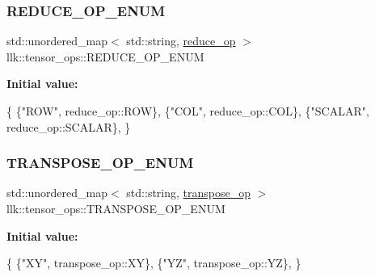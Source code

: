 \subsubsection{\texorpdfstring{R\+E\+D\+U\+C\+E\+\_\+\+O\+P\+\_\+\+E\+N\+UM}{REDUCE\_OP\_ENUM}}
{\footnotesize\ttfamily std\+::unordered\+\_\+map$<$ std\+::string, \hyperlink{namespacellk_1_1tensor__ops_a57720b85adbe1e9b3bbab02b985f0d8d}{reduce\+\_\+op} $>$ llk\+::tensor\+\_\+ops\+::\+R\+E\+D\+U\+C\+E\+\_\+\+O\+P\+\_\+\+E\+N\+UM}

{\bfseries Initial value\+:}
\begin{DoxyCode}
\{
    \{\textcolor{stringliteral}{"ROW"}, reduce\_op::ROW\},
    \{\textcolor{stringliteral}{"COL"}, reduce\_op::COL\},
    \{\textcolor{stringliteral}{"SCALAR"}, reduce\_op::SCALAR\},
\}
\end{DoxyCode}
\mbox{\label{namespacellk_1_1tensor__ops_a699c757265f6f94f500fd25438919ffa}} 
\subsubsection{\texorpdfstring{T\+R\+A\+N\+S\+P\+O\+S\+E\+\_\+\+O\+P\+\_\+\+E\+N\+UM}{TRANSPOSE\_OP\_ENUM}}
{\footnotesize\ttfamily std\+::unordered\+\_\+map$<$ std\+::string, \hyperlink{namespacellk_1_1tensor__ops_a3a9aca203c5d38260a1dd35253d57ee8}{transpose\+\_\+op} $>$ llk\+::tensor\+\_\+ops\+::\+T\+R\+A\+N\+S\+P\+O\+S\+E\+\_\+\+O\+P\+\_\+\+E\+N\+UM}

{\bfseries Initial value\+:}
\begin{DoxyCode}
\{
    \{\textcolor{stringliteral}{"XY"}, transpose\_op::XY\},
    \{\textcolor{stringliteral}{"YZ"}, transpose\_op::YZ\},
\}
\end{DoxyCode}
\mbox{\label{namespacellk_1_1tensor__ops_a1b8ad840d024cd3f488a6ab57dd3a36b}} 
